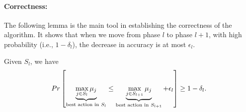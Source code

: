 \paragraph{Correctness:}
The following lemma is the main tool in establishing the correctness of the algorithm. It shows that when we move from phase $l$ to phase $l+1$, with high probability (i.e., $1-\delta_l$), the decrease in accuracy is at most $\epsilon_l$.

\begin{lemma}
Given $S_l$, we have
$$Pr\left[\underbrace{{\displaystyle \max_{j\in
S_{l}}\mu_{j}}}_{\text{best action in 
\ensuremath{S_l}}}\le\underbrace{{\displaystyle \max_{j\in
S_{l+1}}\mu_{j}}}_{\text{best action in
\ensuremath{S_{l+1}}}}+\epsilon_{l}\right]\ge1-\delta_{l}.$$
\end{lemma}

